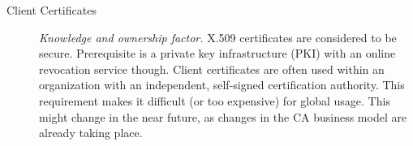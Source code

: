 \begin{description}
    \item[Client Certificates] \emph{Knowledge and ownership factor.}
        X.509 certificates are considered to be secure. Prerequisite is
        a private key infrastructure (PKI) with an online revocation
        service though. Client certificates are often used within an
        organization with an independent, self-signed certification
        authority. This requirement makes it difficult (or too
        expensive) for global usage. This might change in the near
        future, as changes in the CA business model are already taking
        place.

\end{description}


            
        

